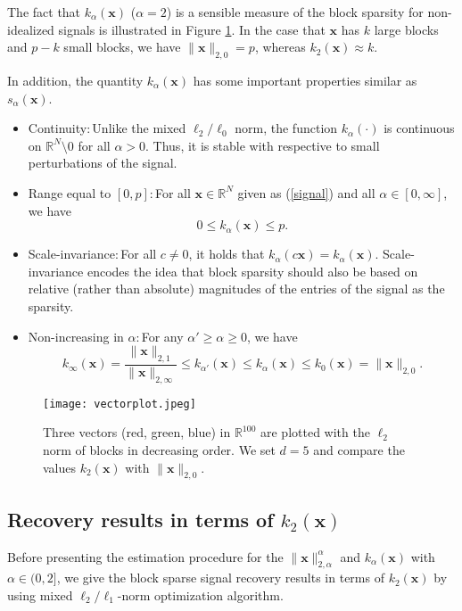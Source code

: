 \documentclass[journal,onecolumn]{IEEEtran}
\begin{document}
The fact that $k_{\alpha}(\mathbf{x})$ ($\alpha=2$) is a sensible measure of the block sparsity for non-idealized signals is illustrated in Figure \ref{fig_1}. In the case that $\mathbf{x}$ has $k$ large blocks and $p-k$ small blocks, we have $\lVert\mathbf{x}\rVert_{2,0}=p$, whereas $k_{2}(\mathbf{x})\approx k$.

In addition, the quantity $k_{\alpha}(\mathbf{x})$ has some important properties similar as $s_{\alpha}(\mathbf{x})$.
\begin{itemize}
\item Continuity:\,Unlike the mixed $\ell_2/\ell_0$ norm, the function $k_{\alpha}(\cdot)$ is continuous on $\mathbb{R}^N\setminus 0$ for all $\alpha>0$. Thus, it is stable with respective to small perturbations of the signal.
\item Range equal to $[0,p]$:\,For all $\mathbf{x}\in\mathbb{R}^N$ given as (\ref{signal}) and all $\alpha\in [0,\infty]$, we have $$
0\leq k_{\alpha}(\mathbf{x})\leq p.
$$
\item Scale-invariance:\,For all $c\neq 0$, it holds that $k_{\alpha}(c\mathbf{x})=k_{\alpha}(\mathbf{x})$. Scale-invariance encodes the idea that block sparsity should also be based on relative (rather than absolute) magnitudes of the entries of the signal as the sparsity.
\item Non-increasing in $\alpha$:\,For any $\alpha'\geq\alpha\geq 0$, we have $$
k_\infty(\mathbf{x})=\frac{\lVert\mathbf{x}\rVert_{2,1}}{\lVert\mathbf{x}\rVert_{2,\infty}}\leq k_{\alpha'}(\mathbf{x})\leq k_{\alpha}(\mathbf{x})\leq k_{0}(\mathbf{x})=\lVert\mathbf{x}\rVert_{2,0}.
$$
\end{itemize}
\begin{figure}
	\centering
	\texttt{[image: vectorplot.jpeg]}
	\caption{Three vectors (red, green, blue) in $\mathbb{R}^{100}$ are plotted with the $\ell_2$ norm of blocks in decreasing order. We set $d=5$ and compare the values $k_2(\mathbf{x})$ with $\lVert\mathbf{x}\rVert_{2,0}$.}
	\label{fig_1}
\end{figure}


\subsection{Recovery results in terms of $k_2(\mathbf{x})$}

Before presenting the estimation procedure for the $\lVert\mathbf{x}\rVert_{2,\alpha}^{\alpha}$ and $k_{\alpha}(\mathbf{x})$ with $\alpha\in(0,2]$, we give the block sparse signal recovery results in terms of $k_2(\mathbf{x})$ by using mixed $\ell_2/\ell_1$-norm optimization algorithm.
\end{document}

